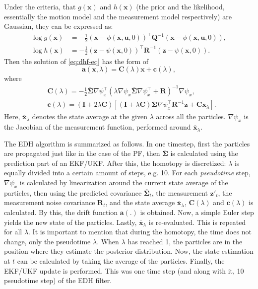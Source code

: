 Under the criteria, that $g(\mathbf{x})$ and $h(\mathbf{x})$ (the prior and the likelihood, essentially the motion model and the measurement model respectively) are Gaussian,
they can be expressed as:
\begin{align}
    \log g(\mathbf{x}) & =-\frac{1}{2}(\mathbf{x}-\phi(\mathbf{x},\mathbf{u},0))^{\top} \mathbf{Q}^{-1}(\mathbf{x}-\phi(\mathbf{x},\mathbf{u},0)),              \\
    \log h(\mathbf{x}) & =-\frac{1}{2}(\mathbf{z}-\psi(\mathbf{x},0))^{\top} \mathbf{R}^{-1}(\mathbf{z}-\psi(\mathbf{x},0)). \label{eq:explicit-log-likelihood}
\end{align}
Then the solution of \eqref{eq:dhf-eq} has the form of
\begin{equation}
    \mathbf{a}(\mathbf{x},\lambda) = \mathbf{C}(\lambda)\mathbf{x} + \mathbf{c}(\lambda),
\end{equation}
where
\begin{align}
     & \mathbf{C}(\lambda) = -\frac{1}{2}\mathbf{\mathbf{\overline\Sigma}}\nabla \psi_x^\top\left(\lambda \nabla \psi_x\mathbf{\overline\Sigma}\nabla \psi_x^\top + \mathbf{R}\right)^{-1}\nabla \psi_x,\label{eq:edh-C}                                     \\
     & \mathbf{c}(\lambda) = \left(\mathbf{I}+2\lambda\mathbf{C}\right)\left[\left(\mathbf{I}+\lambda\mathbf{C}\right)\mathbf{\overline\Sigma}\nabla \psi_x^\top\mathbf{R}^{-1}\mathbf{z} + \mathbf{C}\overline{\mathbf{x}}_\lambda\right]. \label{eq:edh-c}
\end{align}
Here, $\overline{\mathbf{x}}_\lambda$ denotes the state average at the given $\lambda$ across all the particles. $\nabla \psi_x$ is the Jacobian of the measurement function, performed around $\overline{\mathbf{x}}_\lambda$.

The EDH algorithm is summarized as follows.
In one timestep, first the particles are propagated just like in the case of the PF, then $\overline{\mathbf{\Sigma}}$ is calculated using the prediction part of an EKF/UKF.  After this, the homotopy is discretized: $\lambda$ is equally divided into a certain amount of steps, e.g. 10. For each \emph{pseudotime} step, $\nabla \psi_x$ is calculated  by linearization around the current state average of the particles, then using the predicted covariance $\overline{\mathbf{\Sigma}}_t$, the measurement $\mathbf{z}'_t$, the measurement noise covariance $\mathbf{R}_t$, and the state average $\overline{\mathbf{x}}_\lambda$, $\mathbf{C}(\lambda)$ and $\mathbf{c}(\lambda)$ is calculated. By this, the drift function $\mathbf{a}(.)$ is obtained. Now, a simple Euler step yields the new state of the particles. Lastly, $\overline{\mathbf{x}}_\lambda$ is re-evaluated. This is repeated for all $\lambda$. It is important to mention that during the homotopy, the time does not change, only the pseudotime $\lambda$. When $\lambda$ has reached 1, the particles are in the position where they estimate the posterior distribution. Now, the state estimation at $t$ can be calculated by taking the average of the particles. Finally, the EKF/UKF update is performed. This was one time step (and along with it, 10 pseudotime step) of the EDH filter.


